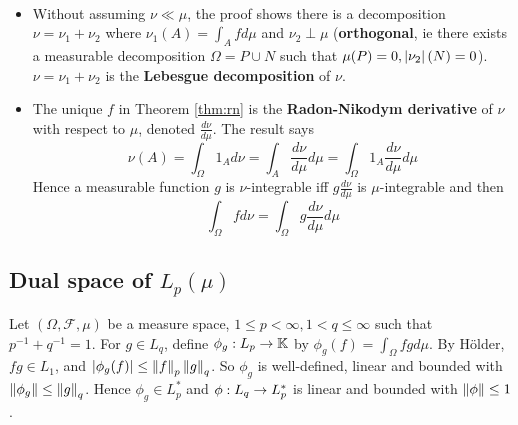 \documentclass{article}
\begin{document}
\begin{rmks}~
  \begin{itemize}
    \item Without assuming $\nu \ll \mu$, the proof shows there is a decomposition $\nu = \nu_1 + \nu_2$ where $\nu_1(A) = \int_A fd\mu$ and $\nu_2 \perp \mu$ ({\bf orthogonal}, ie there exists a measurable decomposition $\Omega = P \cup N$ such that $\mu(P) = 0, \left\lvert \nu_2\right\rvert(N) = 0$). $\nu = \nu_1 + \nu_2$ is the {\bf Lebesgue decomposition} of $\nu$.
    \item The unique $f$ in Theorem \ref{thm:rn} is the {\bf Radon-Nikodym derivative} of $\nu$ with respect to $\mu$, denoted $\frac{d\nu}{d\mu}$. The result says
    $$\nu(A) = \int_\Omega 1_A d\nu = \int_A \frac{d\nu}{d\mu} d\mu = \int_\Omega 1_A \frac{d\nu}{d\mu} d\mu$$
    Hence a measurable function $g$ is $\nu$-integrable iff $g\frac{d\nu}{d\mu}$ is $\mu$-integrable and then
    $$\int_\Omega f d\nu = \int_\Omega g \frac{d\nu}{d\mu} d\mu$$
  \end{itemize}
\end{rmks}

\subsection{Dual space of \texorpdfstring{$L_p(\mu)$}{Lp(mu)}}

Let $(\Omega, \mathcal F, \mu)$ be a measure space, $1 \le p < \infty, 1 < q \le \infty$ such that $p^{-1} + q^{-1} = 1$. For $g \in L_q$, define $\phi_g : L_p \rightarrow \mathbb K$ by $\phi_g(f) = \int_\Omega fg d\mu$. By Hölder, $fg \in L_1$, and $\left\lvert \phi_g(f)\right\rvert \le \left\lVert f\right\rVert_p \left\lVert g\right\rVert_q$. So $\phi_g$ is well-defined, linear and bounded with $\left\lVert \phi_g\right\rVert \le \left\lVert g\right\rVert_q$. Hence $\phi_g \in L_p^*$ and $\phi : L_q \rightarrow L_p^*$ is linear and bounded with $\left\lVert \phi\right\rVert \le 1$.
\end{document}
